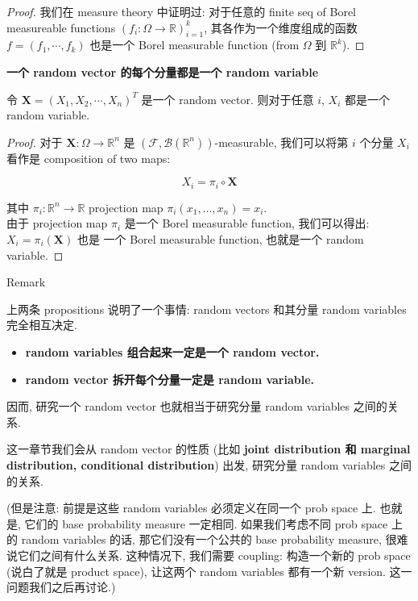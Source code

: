 \documentclass{qlnotes-export}
\begin{document}
\begin{proof}

我们在 measure theory 中证明过: 对于任意的 finite seq of Borel measureable functions \((f_{i}:\Omega\rightarrow{\mathbb{R}})_{i = 1}^{k}\), 其各作为一个维度组成的函数 \(f = (f_{1},\cdots,f_{k})\) 也是一个 Borel measurable function (from \(\Omega\) 到 \({\mathbb{R}}^{k}\)).

\end{proof}

\begin{proposition}{\protect{}\label{kn-random-vector-random-variable}{\textbf{一个
random vector 的每个分量都是一个 random variable}}}

令 \(\mathbf{X} = (X_{1},X_{2},\cdots,X_{n})^{T}\) 是一个 random vector. 则对于任意 \(i\), \(X_{i}\) 都是一个 random variable.

\end{proposition}

\begin{proof}

对于 \(\mathbf{X}:\Omega\rightarrow{\mathbb{R}}^{n}\) 是 \((\mathcal{F},\mathcal{B}({\mathbb{R}}^{n}))\)-measurable, 我们可以将第 \(i\) 个分量 \(X_{i}\) 看作是 composition of two maps:

\[X_{i} = \pi_{i} \circ \mathbf{X}\]

其中 \(\pi_{i}:{\mathbb{R}}^{n}\rightarrow{\mathbb{R}}\) projection map \(\pi_{i}(x_{1},\ldots,x_{n}) = x_{i}\).\\
由于 projection map \(\pi_{i}\) 是一个 Borel measurable function, 我们可以得出: \(X_{i} = \pi_{i}(\mathbf{X})\) 也是 一个 Borel measurable function, 也就是一个 random variable.

\end{proof}

\begin{qlremark}{Remark}

上两条 propositions 说明了一个事情: random vectors 和其分量 random variables 完全相互决定.

\begin{itemize}
\item
  \textbf{random variables 组合起来一定是一个 random vector.}
\item
  \textbf{random vector 拆开每个分量一定是 random variable.}
\end{itemize}

因而, 研究一个 random vector 也就相当于研究分量 random variables 之间的关系.

这一章节我们会从 random vector 的性质 (比如 \textbf{joint distribution 和 marginal distribution, conditional distribution}) 出发, 研究分量 random variables 之间的关系.

(但是注意: 前提是这些 random variables 必须定义在同一个 prob space 上. 也就是, 它们的 base probability measure 一定相同. 如果我们考虑不同 prob space 上的 random variables 的话, 那它们没有一个公共的 base probability measure, 很难说它们之间有什么关系. 这种情况下, 我们需要 coupling: 构造一个新的 prob space (说白了就是 product space), 让这两个 random variables 都有一个新 version. 这一问题我们之后再讨论.)

\end{qlremark}
\end{document}
